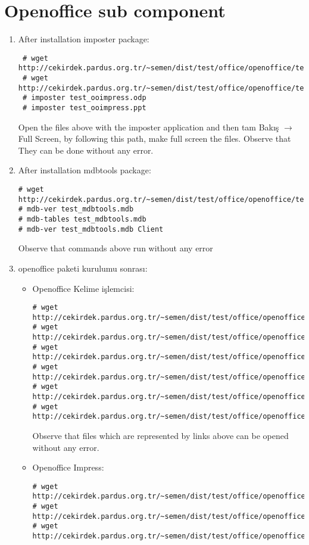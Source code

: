 \documentclass[a4paper,10pt]{article}
\begin{document}
\section{Openoffice sub component}
\begin{enumerate}
 \item After installation imposter package:
\begin{verbatim}
 # wget http://cekirdek.pardus.org.tr/~semen/dist/test/office/openoffice/test_ooimpress.odp
 # wget http://cekirdek.pardus.org.tr/~semen/dist/test/office/openoffice/test_ooimpress.ppt
 # imposter test_ooimpress.odp
 # imposter test_ooimpress.ppt
\end{verbatim}
Open the files above with the imposter application and then tam Bakış $\rightarrow$ Full Screen, by following this path, make full screen the files. Observe that They can be done without any error.

 \item After installation mdbtools package:
\begin{verbatim}
# wget http://cekirdek.pardus.org.tr/~semen/dist/test/office/openoffice/test_mdbtools.mdb
# mdb-ver test_mdbtools.mdb
# mdb-tables test_mdbtools.mdb
# mdb-ver test_mdbtools.mdb Client
\end{verbatim}

Observe that commands above run without any error

\item openoffice paketi kurulumu sonrası:
\begin{itemize}
\item Openoffice Kelime işlemcisi:
\begin{verbatim}
# wget http://cekirdek.pardus.org.tr/~semen/dist/test/office/openoffice/test_oowriter.doc
# wget http://cekirdek.pardus.org.tr/~semen/dist/test/office/openoffice/test_oowriter.odt
# wget http://cekirdek.pardus.org.tr/~semen/dist/test/office/openoffice/test_oowriter.sxw
# wget http://cekirdek.pardus.org.tr/~semen/dist/test/office/openoffice/test_oowriter.txt
# wget http://cekirdek.pardus.org.tr/~semen/dist/test/office/openoffice/test_oowriter.ott
# wget http://cekirdek.pardus.org.tr/~semen/dist/test/office/openoffice/test_oowriter.html
\end{verbatim}

Observe that files which are represented by links above can be opened without any error.

\item Openoffice Impress:
\begin{verbatim}
# wget http://cekirdek.pardus.org.tr/~semen/dist/test/office/openoffice/test_ooimpress.odp
# wget http://cekirdek.pardus.org.tr/~semen/dist/test/office/openoffice/test_ooimpress.ppt
# wget http://cekirdek.pardus.org.tr/~semen/dist/test/office/openoffice/test_ooimpress.pot
\end{verbatim}


\end{itemize}
\end{enumerate}
\end{document}

